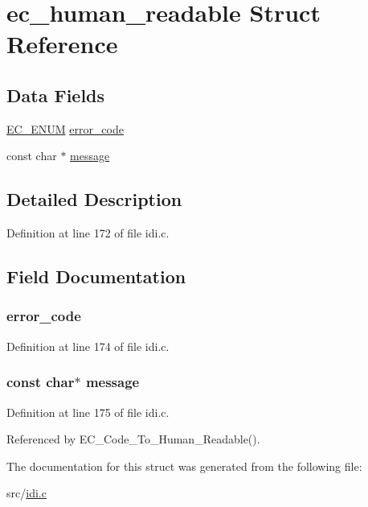 \hypertarget{structec__human__readable}{\section{ec\+\_\+human\+\_\+readable Struct Reference}
\label{structec__human__readable}
}
\subsection*{Data Fields}
\begin{DoxyCompactItemize}
\item 
\hyperlink{idi_8c_a16689154c729ce352ec6d746b8ab663e}{E\+C\+\_\+\+E\+N\+U\+M} \hyperlink{structec__human__readable_a557bf51119126ad88e40be2219c3fdb5}{error\+\_\+code}
\item 
const char $\ast$ \hyperlink{structec__human__readable_a254bf0858da09c96a48daf64404eb4f8}{message}
\end{DoxyCompactItemize}


\subsection{Detailed Description}


Definition at line 172 of file idi.\+c.



\subsection{Field Documentation}
\hypertarget{structec__human__readable_a557bf51119126ad88e40be2219c3fdb5}{
\subsubsection[{error\+\_\+code}]{ error\+\_\+code}}\label{structec__human__readable_a557bf51119126ad88e40be2219c3fdb5}


Definition at line 174 of file idi.\+c.

\hypertarget{structec__human__readable_a254bf0858da09c96a48daf64404eb4f8}{
\subsubsection[{message}]{\setlength{\rightskip}{0pt plus 5cm}const char$\ast$ message}}\label{structec__human__readable_a254bf0858da09c96a48daf64404eb4f8}


Definition at line 175 of file idi.\+c.



Referenced by E\+C\+\_\+\+Code\+\_\+\+To\+\_\+\+Human\+\_\+\+Readable().



The documentation for this struct was generated from the following file\+:\begin{DoxyCompactItemize}
\item 
src/\hyperlink{idi_8c}{idi.\+c}\end{DoxyCompactItemize}
